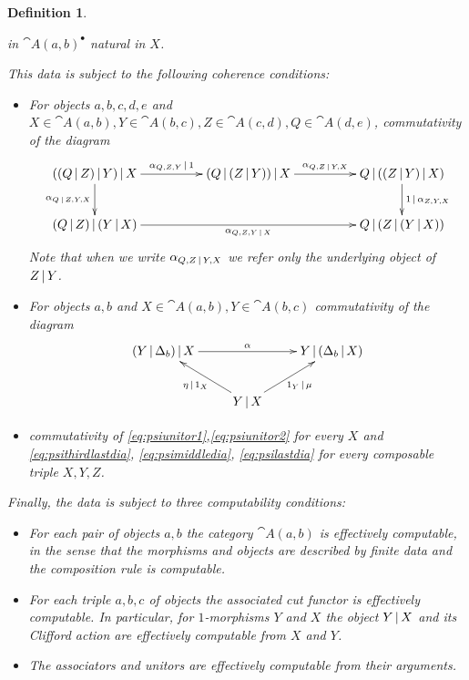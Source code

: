 \documentclass[english,letter paper,12pt,leqno]{article}
\theoremstyle{example}
\newtheorem{definition}[theorem]{Definition}
\numberwithin{equation}{section}
\begin{document}
\begin{definition}
\begin{itemize}
in $\cat{A}(a,b)^\bullet$ natural in $X$.
\end{itemize}
This data is subject to the following coherence conditions:
\begin{itemize}
\item[(1)] For objects $a,b,c,d,e$ and $X \in \cat{A}(a,b),Y \in \cat{A}(b,c),Z \in \cat{A}(c,d),Q \in \cat{A}(d,e)$, commutativity of the diagram
\begin{equation}
\xymatrix@C+2pc{
((Q \l Z) \l Y ) \l X \ar[d]_-{\alpha_{Q \l Z, Y, X}}\ar[r]^-{\alpha_{Q,Z,Y} \l 1} & (Q \l (Z \l Y)) \l X \ar[r]^-{\alpha_{Q, Z \l Y, X}} & Q \l ( ( Z \l Y ) \l X ) \ar[d]^-{1 \l \alpha_{Z,Y,X}}\\
(Q \l Z) \l (Y \l X) \ar[rr]_-{\alpha_{Q, Z, Y \l X}} & & Q \l ( Z \l ( Y \l X ) )
}
\end{equation}
Note that when we write $\alpha_{Q, Z \,|\, Y, X}$ we refer only the underlying object of $Z \,|\, Y$.
\item[(2)] For objects $a,b$ and $X \in \cat{A}(a,b), Y \in \cat{A}(b,c)$ commutativity of the diagram
\begin{equation}\label{eq:unitor_constraint_cut}
\xymatrix{
(Y \l \Delta_b ) \l X \ar[rr]^-{\alpha} & & Y \l ( \Delta_b \l X )\\
& Y \l X \ar[ul]^-{\eta \l 1_X} \ar[ur]_-{1_Y \l \mu}
}
\end{equation}
\item[(3)] commutativity of \eqref{eq:psiunitor1},\eqref{eq:psiunitor2} for every $X$ and \eqref{eq:psithirdlastdia}, \eqref{eq:psimiddledia}, \eqref{eq:psilastdia} for every composable triple $X,Y,Z$.
\end{itemize}
Finally, the data is subject to three computability conditions:
\begin{itemize}
\item[(1)] For each pair of objects $a,b$ the category $\cat{A}(a,b)$ is effectively computable, in the sense that the morphisms and objects are described by finite data and the composition rule is computable.
\item[(2)] For each triple $a,b,c$ of objects the associated cut functor is effectively computable. In particular, for $1$-morphisms $Y$ and $X$ the object $Y \,|\, X$ and its Clifford action are effectively computable from $X$ and $Y$.
\item[(3)] The associators and unitors are effectively computable from their arguments.
\end{itemize}
\end{definition}
\end{document}
